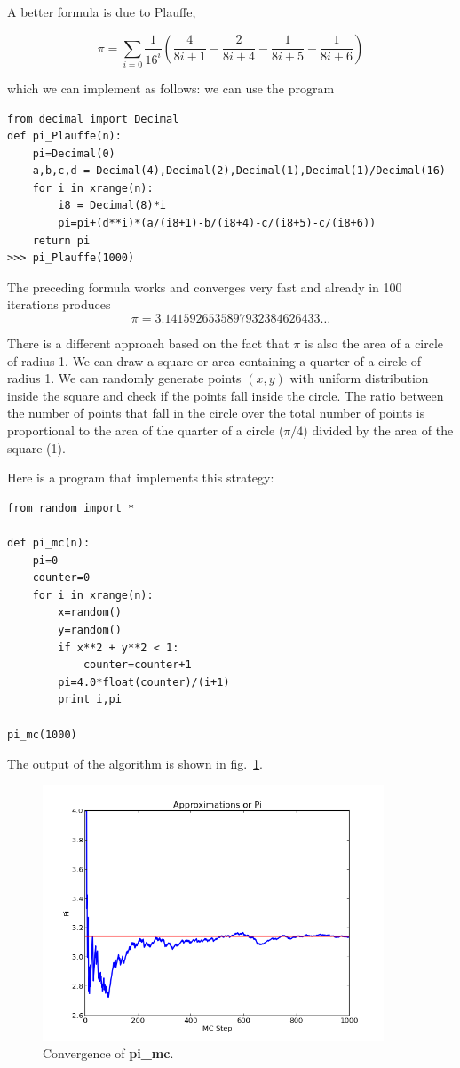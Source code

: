 \documentclass[justified,sixbynine]{tufte-book}
\theoremstyle{plain}%
\theoremstyle{definition}
\theoremstyle{remark}
\begin{document}
\begin{fullwidth}
A better formula is due to Plauffe,

\begin{equation}
\pi = \sum_{i=0} \frac{1}{16^i} \left(
\frac{4}{8i+1}-\frac{2}{8i+4}-\frac{1}{8i+5}-\frac{1}{8i+6}
\right)
\end{equation}

which we can implement as follows:
we can use the program
\begin{lstlisting}
from decimal import Decimal
def pi_Plauffe(n):
    pi=Decimal(0)
    a,b,c,d = Decimal(4),Decimal(2),Decimal(1),Decimal(1)/Decimal(16)
    for i in xrange(n):
        i8 = Decimal(8)*i
        pi=pi+(d**i)*(a/(i8+1)-b/(i8+4)-c/(i8+5)-c/(i8+6))
    return pi
>>> pi_Plauffe(1000)
\end{lstlisting}

The preceding formula works and converges very fast and already in 100 iterations produces
\begin{equation}
\pi = 3.1415926535897932384626433\dots
\end{equation}

There is a different approach based on the fact that $\pi$ is also the
area of a circle of radius 1. We can draw a square or area containing
a quarter of a circle of radius 1. We can randomly generate points $(x,y)$
with uniform distribution inside the square and check if the points fall inside
the circle. The ratio between the number of points that fall in
the circle over the total number of points is proportional to the area of
the quarter of a circle ($\pi /4$) divided by the area of the square (1).

Here is a program that implements this strategy:
\begin{lstlisting}
from random import *

def pi_mc(n):
    pi=0
    counter=0
    for i in xrange(n):
        x=random()
        y=random()
        if x**2 + y**2 < 1:
            counter=counter+1
        pi=4.0*float(counter)/(i+1)
        print i,pi

pi_mc(1000)
\end{lstlisting}

The output of the algorithm is shown in fig.~\ref{pi-plot}.

\begin{figure}[ht]
\centering\includegraphics[width=4in]{images/pi.png}
\caption{Convergence of {\bf pi\_mc}.\label{pi-plot}}
\end{figure}


\end{fullwidth}
\end{document}
